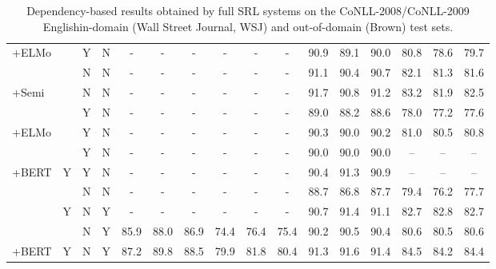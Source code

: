 \begin{table*}[t]
\begin{center}
\begin{tabular}{lccccccccccccccc}
\quad+ELMo & & Y & N & - & - & - & - & - & - & 90.9 & 89.1 & 90.0 & 80.8 & 78.6 & 79.7\\
\rowcolor{gray!15}
\citet{DBLP:conf/emnlp/CaiL19} & & N & N & - & - & - & - & - & - & 91.1 & 90.4 & 90.7 & 82.1 & 81.3 & 81.6\\
\rowcolor{gray!15}
\quad+Semi & & N & N & - & - & - & - & - & - & 91.7 & 90.8 & 91.2 & 83.2 & 81.9 & 82.5\\
\citet{DBLP:conf/naacl/KasaiFFRR19} & & Y & N & - & - & - & - & - & - & 89.0 & 88.2 & 88.6 & 78.0 & 77.2 & 77.6\\
\quad+ELMo & & Y & N & - & - & - & - & - & - & 90.3 & 90.0 & 90.2 & 81.0 & 80.5 & 80.8\\
\rowcolor{gray!15}
\citet{DBLP:conf/emnlp/HeLZ19} & & Y & N & - & - & - & - & - & - & 90.0 & 90.0 & 90.0 & – & – & –\\
\rowcolor{gray!15}
\quad+BERT & Y & Y & N & - & - & - & - & - & - & 90.4 & 91.3 & 90.9 & – & – & –\\
\citet{DBLP:journals/taslp/MunirZL21} & & N & N & - & - & - & - & - & - & 88.7 & 86.8 & 87.7 & 79.4 & 76.2 & 77.7 \\
\rowcolor{gray!15}
\citet{DBLP:conf/emnlp/ChenLT19} & Y & N & Y & - & - & - & - & - & - & 90.7 & 91.4 & 91.1 & 82.7 & 82.8 & 82.7\\
\citet{DBLP:journals/kbs/Fernandez-Gonzalez23} & & N & Y & 85.9 & 88.0 & 86.9 & 74.4 & 76.4 & 75.4 & 90.2 & 90.5 & 90.4 & 80.6 & 80.5 & 80.6\\
\quad+BERT & Y & N & Y & 87.2 & 89.8 & 88.5 & 79.9 & 81.8 & 80.4 & 91.3 & 91.6 & 91.4 & 84.5 & 84.2 & 84.4\\


\bottomrule
\end{tabular}
\caption{
Dependency-based results obtained by full SRL systems on the CoNLL-2008/CoNLL-2009 Englishin-domain (Wall Street Journal, WSJ) and out-of-domain (Brown) test sets.
}
\label{tab:result-09}
\end{center}
\vspace{-2mm}
\end{table*}
